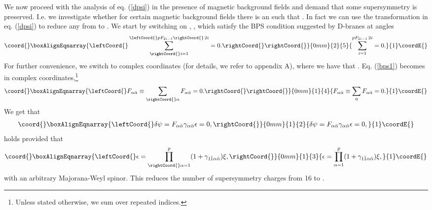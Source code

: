 \documentclass[a4paper,12pt,oneside]{article}
\begin{document}
We now proceed with the analysis of eq. (\ref{dpsi}) in the presence of 
magnetic background fields and demand that some supersymmetry is preserved. 
I.e. we investigate whether for certain magnetic background fields there 
is an \myHighlight{$\epsilon $}\coordHE{} such that \coordHE{}. In fact we can use the \myHighlight{$\eta$}\coordHE{} 
transformation in eq. (\ref{dpsi}) to reduce any \coordHE{} from \coordHE{} 
to \coordHE{}.
We start by switching on \coordHE{}, \coordHE{}, 
which satisfy the BPS condition suggested by D-branes at angles
\begin{eqnarray}\coord{}\boxAlignEqnarray{\leftCoord{}
\sum_{\rightCoord{}i=1}^{\leftCoord{}pF_{2i-1}\rightCoord{}\,2i}=0.\rightCoord{}\label{bps1}
\rightCoord{}}{0mm}{2}{5}{
\sum_{i=1}^{pF_{2i-1}\,2i}=0.}{1}\coordE{}\end{eqnarray}
For further convenience, 
we switch to complex coordinates (for details, we refer to appendix A),
where we have that \coordHE{}. 
Eq. (\ref{bps1}) becomes in complex coordinates,\footnote{Unless
stated otherwise, we sum over repeated indices.}
\begin{eqnarray}\coord{}\boxAlignEqnarray{\leftCoord{}
F_{\alpha \bar\alpha }\equiv\sum_{\rightCoord{}\alpha } F_{\alpha \bar\alpha } =0.  \rightCoord{}\label{bps2}
\rightCoord{}}{0mm}{1}{4}{
F_{\alpha \bar\alpha }\equiv\sum_{\alpha } F_{\alpha \bar\alpha } =0.  }{1}\coordE{}\end{eqnarray}
We get that
\begin{eqnarray}\coord{}\boxAlignEqnarray{\leftCoord{}
\delta\psi =F_{\alpha \bar\alpha }\gamma_{\alpha \bar\alpha }\epsilon=0,
\rightCoord{}}{0mm}{1}{2}{
\delta\psi =F_{\alpha \bar\alpha }\gamma_{\alpha \bar\alpha }\epsilon=0,
}{1}\coordE{}\end{eqnarray}
holds provided that
\begin{eqnarray}\coord{}\boxAlignEqnarray{\leftCoord{}
\epsilon=\prod_{\rightCoord{}\alpha =1}^p(1+\gamma_{1\bar 1\alpha \bar\alpha })\xi,
\rightCoord{}}{0mm}{1}{3}{
\epsilon=\prod_{\alpha =1}^p(1+\gamma_{1\bar 1\alpha \bar\alpha })\xi,
}{1}\coordE{}\end{eqnarray}
with \myHighlight{$\xi$}\coordHE{} an arbitrary Majorana-Weyl spinor. This reduces the number of 
supersymmetry charges from 16 to \coordHE{}.
\end{document}
